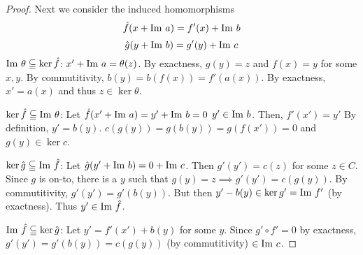 \documentclass{article}
\theoremstyle{definition}
\theoremstyle{remark}
\begin{document}
\begin{proof}
     Next we consider the induced homomorphisms
     $$\hat{f}(x + \mathrm{Im}\  a) = f'(x) + \mathrm{Im}\  b$$
     $$\hat{g}(y + \mathrm{Im}\  b) = g'(y) + \mathrm{Im}\  c$$
     $\mathrm{Im}\  \theta \subseteqq \ker \hat{f}$: $x' + \mathrm{Im}\  a = \theta(z)$. By exactness, $g(y) = z$ and $f(x) = y$ for some $x, y$. By commutitivity, $b(y) = b(f(x)) = f'(a(x))$. By exactness, $x' = a(x)$  and thus $z \in \ker \theta.$ 
    
     $\ker \hat{f} \subseteqq \mathrm{Im}\  \theta$: Let $\hat{f}(x' + \mathrm{Im}\  a) = y' + \mathrm{Im}\  b = 0$ $y' \in \mathrm{Im}\  b$. Then, $f'(x') = y'$ By definition, $y' = b(y)$. $c(g(y)) = g(b(y)) = g(f(x')) =0$ and $g(y) \in \ker c$.

     $\ker \hat{g} \subseteqq \mathrm{Im}\  \hat{f}$: Let $\hat{g}(y' + \mathrm{Im}\  b) = 0 + \mathrm{Im}\  c$. Then $g'(y') = c(z)$ for some $z \in C$. Since $g$ is on-to, there  is a $y$ such that $g(y) = z \implies g'(y') = c(g(y))$. By commutitivity, $g'(y') = g'(b(y)).$ But then $y' - b(y) \in \ker g' = \mathrm{Im}\  f'$ (by exactness). Thus $y' \in \mathrm{Im}\  \hat{f}$. 

     $\mathrm{Im}\  \hat{f} \subseteqq \ker \hat{g}$: Let $y' = f'(x') + b(y)$ for some $y$. Since $g' \circ f' = 0$ by exactness, $g'(y') = g'(b(y)) = c(g(y))$ (by commutitivity) $\in \mathrm{Im}\  c$. 
\end{proof}
\end{document}
